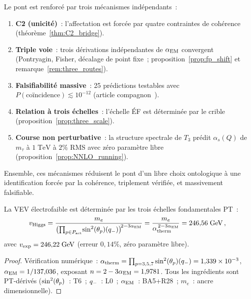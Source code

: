\documentclass[12pt,a4paper]{article}
\begin{document}
\begin{remarque}
\label{rem:bridge_summary}
Le pont est renforcé par trois mécanismes indépendants~:
\begin{enumerate}[nosep]
\item \textbf{C2 (unicité)}~: l'affectation est forcée par quatre
  contraintes de cohérence (théorème~\ref{thm:C2_bridge}).
\item \textbf{Triple voie}~: trois dérivations indépendantes de
  $\alpha_{\mathrm{EM}}$ convergent (Pontryagin, Fisher, décalage de point
  fixe~; proposition~\ref{prop:fp_shift} et
  remarque~\ref{rem:three_routes}).
\item \textbf{Falsifiabilité massive}~: 25 prédictions testables
  avec $P(\text{coïncidence}) \lesssim 10^{-12}$ (article
  compagnon~\cite{companion_physics}).
\item \textbf{Relation à trois échelles}~: l'échelle ÉF est
  déterminée par le crible (proposition~\ref{prop:three_scale}).
\item \textbf{Course non perturbative}~: la structure spectrale de
  $T_3$ prédit $\alpha_s(Q)$ de $m_\tau$ à $1\;\mathrm{TeV}$ à $2\%$
  RMS avec zéro paramètre libre
  (proposition~\ref{prop:NNLO_running}).
\end{enumerate}
Ensemble, ces mécanismes réduisent le pont d'un libre choix
ontologique à une identification forcée par la cohérence,
triplement vérifiée, et massivement falsifiable.
\end{remarque}

\begin{proposition}
\label{prop:three_scale}
La VEV électrofaible est déterminée par les trois échelles
fondamentales PT~:
\begin{equation}
  v_{\rm Higgs}
  = \frac{m_e}
         {\bigl(\prod_{p\in P_{\mathrm{act}}}\!\sin^2(\theta_{p})(q_{-})\bigr)^{\!2 - 3\alpha_{\mathrm{EM}}}}
  = \frac{m_e}{\alpha_{\rm therm}^{\,2 - 3\alpha_{\mathrm{EM}}}}
  = 246{,}56\;\mathrm{GeV}\,,
  \label{eq:three_scale}
\end{equation}
avec $v_{\rm exp} = 246{,}22\;\mathrm{GeV}$ (erreur $0{,}14\%$,
zéro paramètre libre).
\end{proposition}

\begin{proof}
Vérification numérique~: $\alpha_{\rm therm} =
\prod_{p=3,5,7}\sin^2(\theta_{p})(q_{-}) = 1{,}339 \times 10^{-3}$,
$\alpha_{\mathrm{EM}} = 1/137{,}036$, exposant $n = 2 - 3\alpha_{\mathrm{EM}} = 1{,}9781$.
Tous les ingrédients sont PT-dérivés ($\sin^2(\theta_{p})$~: T6~; $q_{-}$~:
L0~; $\alpha_{\mathrm{EM}}$~: BA5+R28~; $m_e$~: ancre dimensionnelle).
\end{proof}
\end{document}
